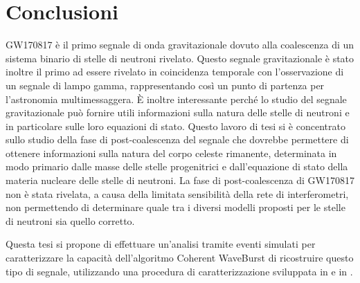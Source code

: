 \chapter{Conclusioni}
\label{chapter:conclusioni}
GW170817 è il primo  segnale di onda gravitazionale dovuto alla coalescenza di un sistema binario di stelle di neutroni rivelato. Questo segnale gravitazionale è stato inoltre il primo ad essere rivelato in  coincidenza temporale con l'osservazione di un segnale di lampo gamma, rappresentando così un punto di partenza per l'astronomia multimessaggera. È inoltre interessante perché lo studio del segnale gravitazionale può fornire utili informazioni sulla natura delle stelle di neutroni e in particolare sulle loro equazioni di stato. Questo lavoro di tesi si è concentrato sullo studio della fase di post-coalescenza del segnale che dovrebbe permettere di ottenere informazioni sulla natura del corpo celeste rimanente,  determinata in modo primario dalle masse delle stelle progenitrici e dall'equazione di stato della materia nucleare delle stelle di neutroni. La fase di post-coalescenza di GW170817 non è stata rivelata, a causa della limitata sensibilità della rete di interferometri, non permettendo di determinare quale tra i diversi modelli proposti per le stelle di neutroni sia quello corretto.

Questa tesi si propone di effettuare un'analisi tramite eventi simulati per caratterizzare la capacità dell'algoritmo Coherent WaveBurst di ricostruire questo tipo di segnale, utilizzando una procedura di caratterizzazione sviluppata in \cite{Puecher_2018} e in \cite{Tringali_2017}.

